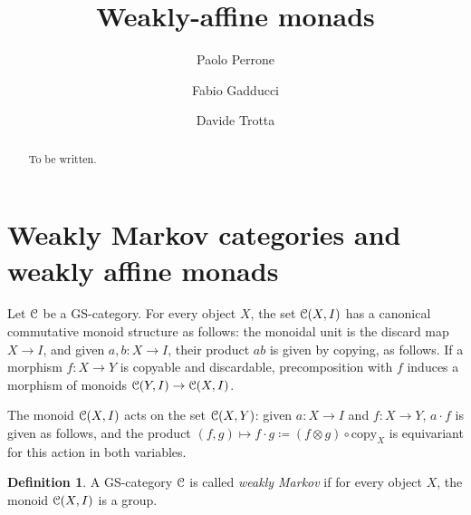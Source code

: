 \documentclass[a4paper,UKenglish,numberwithinsect,cleveref, autoref, thm-restate]{lipics-v2021}
\title{Weakly-affine monads}
\author{Paolo Perrone}{Department of Computer Science, University of Oxford}{paolo.perrone.math@gmail.com}{ }{}
\author{Fabio Gadducci}{Department of Computer Science, University of Pisa, Pisa, IT}{fabio.gadducci@unipi.it}{ https://orcid.org/
0000-0003-0690-3051}{}
\author{ Davide Trotta }{Department of Computer Science, University of Pisa, Pisa, IT}{trottadavide92@gmail.com}{https://orcid.org/0000-0003-4509-594X}{}
\theoremstyle{plain} %
\theoremstyle{definition} %
\newtheorem{mydefinition}[mytheorem]{Definition}
\newtheorem{myremark}[mytheorem]{Remark}
\begin{document}
\maketitle

\begin{abstract}
To be written.
\end{abstract}

\section{Weakly Markov categories and weakly affine monads}
\iffalse
\todo[inline]{Se vogliamo generalizzare esempio la proposizione 1.5 da weakly monad su cartesiana a weakly monad su weakly markov, mi sembra che la codizione da chiedere potrebbe essere che T1 sia un gruppo, e che sia ``compatibile'' con la struttura GS. Ho abbazato una possibile definizione }
\begin{mydefinition}
Let $\mC$ be a GS-monoidal category. An internal group $(G,\cdot,I)$ is said to be \textbf{compatible} with the GS-monoidal structure of $\mC$ if every set $\mC(X,G)$ is a group with the following operation, identity element and inverse:
\ctikzfig{group-structure}
 
\end{mydefinition}
\begin{myremark}
Notice that if $\mC$ is a cartesian monoidal category, every internal group is compatible.
\end{myremark}
\fi
Let $\mC$ be a GS-category. For every object $X$, the set $\mathcal{C}(X,I)$ 
has a canonical commutative monoid structure as follows: the monoidal unit is the discard map $X\to I$, and given $a,b:X\to I$, their product $ab$ is given by copying, as follows.
If a morphism $f:X\to Y$ is copyable and discardable, precomposition with $f$ induces a morphism of monoids $\mathcal{C}(Y,I)\to\mathcal{C}(X,I)$. 

The monoid $\mathcal{C}(X,I)$ acts on the set $\mathcal{C}(X,Y)$: given $a:X\to I$ and $f:X\to Y$, $a\cdot f$ is given as follows,
and the product $(f,g)\mapsto f\cdot g \coloneqq (f\otimes g)\circ\mathrm{copy}_X$ is equivariant for this action in both variables. 

\begin{mydefinition}
 A GS-category $\mC$ is called \emph{weakly Markov} if for every object $X$, the monoid $\mathcal{C}(X,I)$ is a group. 
\end{mydefinition}
\end{document}
